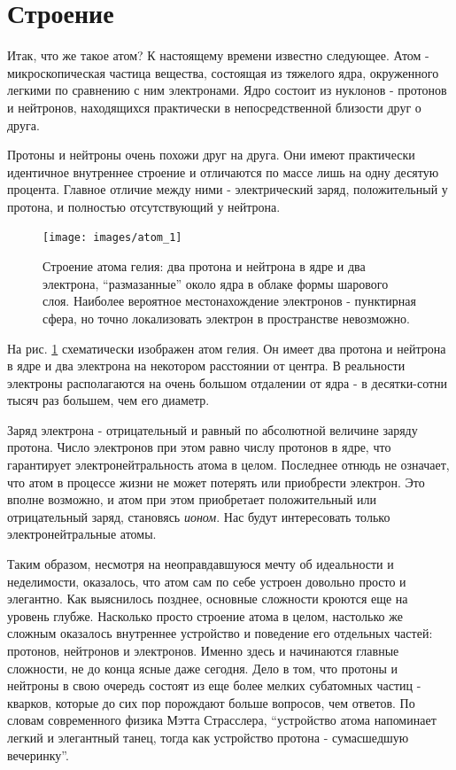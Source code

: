 \section*{Строение}

Итак, что же такое атом? 
К настоящему времени известно следующее.
Атом - микроскопическая частица вещества, состоящая из тяжелого ядра, окруженного легкими по сравнению с ним электронами.
Ядро состоит из нуклонов - протонов и нейтронов, находящихся практически в непосредственной близости друг о друга.

Протоны и нейтроны очень похожи друг на друга.
Они имеют практически идентичное внутреннее строение и отличаются по массе лишь на одну десятую процента.
Главное отличие между ними - электрический заряд, положительный у протона, и полностью отсутствующий у нейтрона.

\begin{figure}[t!]
   \centering
   \texttt{[image: images/atom\_1]}
   \caption{Строение атома гелия: два протона и нейтрона в ядре и два электрона, ``размазанные'' около ядра в облаке формы шарового слоя. Наиболее вероятное местонахождение электронов - пунктирная сфера, но точно локализовать электрон в пространстве невозможно.}
   \label{fig:atom_1}
\end{figure}

На рис. \ref{fig:atom_1} схематически изображен атом гелия.
Он имеет два протона и нейтрона в ядре и два электрона на некотором расстоянии от центра.
В реальности электроны располагаются на очень большом отдалении от ядра - в десятки-сотни тысяч раз большем, чем его диаметр.

Заряд электрона - отрицательный и равный по абсолютной величине заряду протона.
Число электронов при этом равно числу протонов в ядре, что гарантирует электронейтральность атома в целом.
Последнее отнюдь не означает, что атом в процессе жизни не может потерять или приобрести электрон.
Это вполне возможно, и атом при этом приобретает положительный или отрицательный заряд, становясь \textit{ионом}.
Нас будут интересовать только электронейтральные атомы.

Таким образом, несмотря на неоправдавшуюся мечту об идеальности и неделимости, оказалось, что атом сам по себе устроен довольно просто и элегантно.
Как выяснилось позднее, основные сложности кроются еще на уровень глубже.
Насколько просто строение атома в целом, настолько же сложным оказалось внутреннее устройство и поведение его отдельных частей: протонов, нейтронов и электронов.
Именно здесь и начинаются главные сложности, не до конца ясные даже сегодня.
Дело в том, что протоны и нейтроны в свою очередь состоят из еще более мелких субатомных частиц - кварков, которые до сих пор порождают больше вопросов, чем ответов.
По словам современного физика Мэтта Страсслера, ``устройство атома напоминает легкий и элегантный танец, тогда как устройство протона - сумасшедшую вечеринку''.

